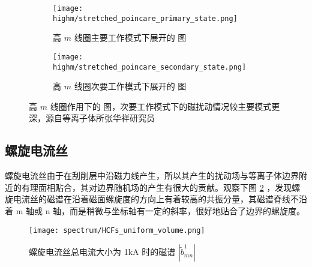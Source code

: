 \begin{figure}[htbp]
  \centering%
  \begin{subfigure}{0.65\textwidth}
      \texttt{[image: highm/stretched\_poincare\_primary\_state.png]}
      \caption{高 $m$ 线圈主要工作模式下展开的 \Poincare 图}
  \end{subfigure}
  \begin{subfigure}{0.7\textwidth}
      \texttt{[image: highm/stretched\_poincare\_secondary\_state.png]}
      \caption{高 $m$ 线圈次要工作模式下展开的 \Poincare 图}
  \end{subfigure}
  \caption{高 $m$ 线圈作用下的 \Poincare 图，次要工作模式下的磁扰动情况较主要模式更深，源自等离子体所张华祥研究员\cite{zhang_highm} }
  \label{fig:highm-stretched-poincare}
\end{figure}


\subsection{螺旋电流丝}

螺旋电流丝由于在刮削层中沿磁力线产生，所以其产生的扰动场与等离子体边界附近的有理面相贴合，其对边界随机场的产生有很大的贡献。观察下图 \ref{fig:HCFs-b1-tilde} ，发现螺旋电流丝的磁谱在沿着磁面螺旋度的方向上有着较高的共振分量，其磁谱脊线不沿着 m 轴或 n 轴，而是稍微与坐标轴有一定的斜率，很好地贴合了边界的螺旋度。

\begin{figure}[htbp]
  \centering%
  \texttt{[image: spectrum/HCFs\_uniform\_volume.png]}
  \caption{螺旋电流丝总电流大小为 1kA 时的磁谱 $|\tilde{b}^1_{mn}|$ }
  \label{fig:HCFs-b1-tilde}
\end{figure}
